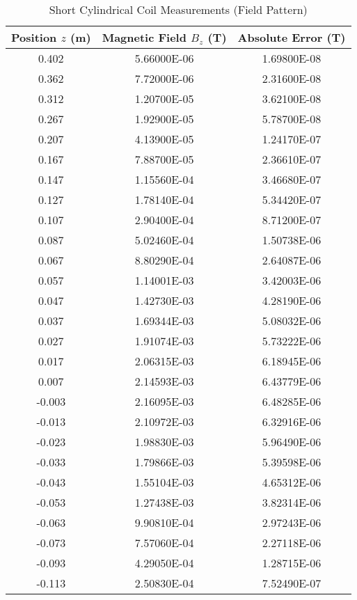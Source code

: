 \begin{appendix}
	\begin{table}[H]
		\centering
		\begin{tabular}{c|c|c}
			Position $z$ (m) & Magnetic Field $B_z$ (T) & Absolute Error (T) \\
			\hline\hline
			0.402 & 5.66000E-06 & 1.69800E-08 \\ \hline
			0.362 & 7.72000E-06 & 2.31600E-08 \\ \hline
			0.312 & 1.20700E-05 & 3.62100E-08 \\ \hline
			0.267 & 1.92900E-05 & 5.78700E-08 \\ \hline
			0.207 & 4.13900E-05 & 1.24170E-07 \\ \hline
			0.167 & 7.88700E-05 & 2.36610E-07 \\ \hline
			0.147 & 1.15560E-04 & 3.46680E-07 \\ \hline
			0.127 & 1.78140E-04 & 5.34420E-07 \\ \hline
			0.107 & 2.90400E-04 & 8.71200E-07 \\ \hline
			0.087 & 5.02460E-04 & 1.50738E-06 \\ \hline
			0.067 & 8.80290E-04 & 2.64087E-06 \\ \hline
			0.057 & 1.14001E-03 & 3.42003E-06 \\ \hline
			0.047 & 1.42730E-03 & 4.28190E-06 \\ \hline
			0.037 & 1.69344E-03 & 5.08032E-06 \\ \hline
			0.027 & 1.91074E-03 & 5.73222E-06 \\ \hline
			0.017 & 2.06315E-03 & 6.18945E-06 \\ \hline
			0.007 & 2.14593E-03 & 6.43779E-06 \\ \hline
			-0.003 & 2.16095E-03 & 6.48285E-06 \\ \hline
			-0.013 & 2.10972E-03 & 6.32916E-06 \\ \hline
			-0.023 & 1.98830E-03 & 5.96490E-06 \\ \hline
			-0.033 & 1.79866E-03 & 5.39598E-06 \\ \hline
			-0.043 & 1.55104E-03 & 4.65312E-06 \\ \hline
			-0.053 & 1.27438E-03 & 3.82314E-06 \\ \hline
			-0.063 & 9.90810E-04 & 2.97243E-06 \\ \hline
			-0.073 & 7.57060E-04 & 2.27118E-06 \\ \hline
			-0.093 & 4.29050E-04 & 1.28715E-06 \\ \hline
			-0.113 & 2.50830E-04 & 7.52490E-07 \\ \hline
		\end{tabular}
		\caption{Short Cylindrical Coil Measurements (Field Pattern)}
		\label{tab:Short_Cylindrical_Coil_Measurements_Field_Pattern}
	\end{table}


\end{appendix}
